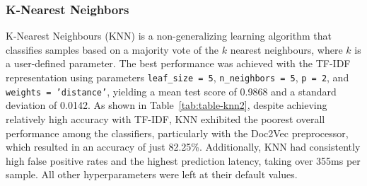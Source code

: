 \documentclass[conference]{IEEEtran}
\begin{document}
\subsubsection{K-Nearest Neighbors}
K-Nearest Neighbours (KNN) is a non-generalizing learning algorithm that classifies samples based on a majority vote of the \(k\) nearest neighbours, where \(k\) is a user-defined parameter. The best performance was achieved with the TF-IDF representation using parameters \texttt{leaf\_size = 5}, \texttt{n\_neighbors = 5}, \texttt{p = 2}, and \texttt{weights = 'distance'}, yielding a mean test score of 0.9868 and a standard deviation of 0.0142. As shown in Table~\ref{tab:table-knn2}, despite achieving relatively high accuracy with TF-IDF, KNN exhibited the poorest overall performance among the classifiers, particularly with the Doc2Vec preprocessor, which resulted in an accuracy of just 82.25\%. Additionally, KNN had consistently high false positive rates and the highest prediction latency, taking over 355ms per sample. All other hyperparameters were left at their default values.


\begin{table}[H]
\caption{\label{tab:table-knn} Metrics for the KNN Classifier.}
\end{table}

\begin{table}[H]
\caption{\label{tab:table-knn2} Performance Metrics for the KNN Classifier.}
\end{table}
\end{document}
